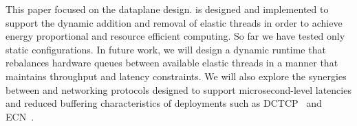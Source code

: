  This paper focused on the \ix dataplane
design. \ix is designed and implemented to support the dynamic
addition and removal of elastic threads in order to achieve energy
proportional and resource efficient computing. So far we have tested
only static configurations. In future work, we will design a dynamic
runtime that rebalances hardware queues between available elastic
threads in a manner that maintains throughput and latency constraints.
%
We will also explore the synergies between \ix and networking
protocols designed to support microsecond-level latencies and reduced
buffering characteristics of \ix deployments such as
DCTCP~\cite{DBLP:conf/sigcomm/AlizadehGMPPPSS10} and
ECN~\cite{ramakrishnan2001addition}.







